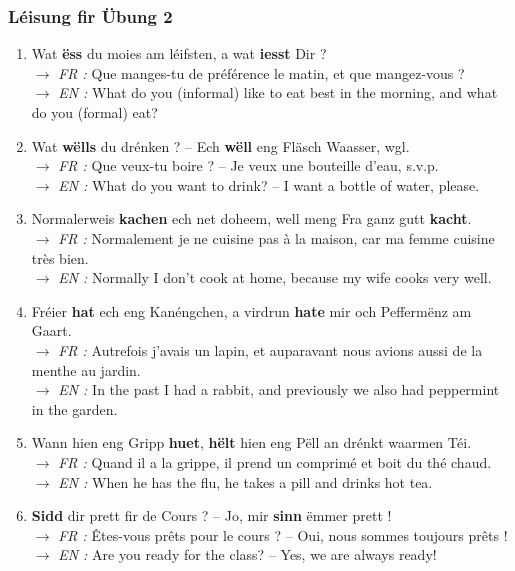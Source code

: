 \subsubsection*{Léisung fir Übung 2}
\begin{enumerate}
    \item Wat \textbf{ëss} du moies am léifsten, a wat \textbf{iesst} Dir ? \\
    $\rightarrow$ \textit{FR :} Que manges-tu de préférence le matin, et que mangez-vous ? \\
    $\rightarrow$ \textit{EN :} What do you (informal) like to eat best in the morning, and what do you (formal) eat?
    \item Wat \textbf{wëlls} du drénken ? -- Ech \textbf{wëll} eng Fläsch Waasser, wgl. \\
    $\rightarrow$ \textit{FR :} Que veux-tu boire ? -- Je veux une bouteille d'eau, s.v.p. \\
    $\rightarrow$ \textit{EN :} What do you want to drink? -- I want a bottle of water, please.
    \item Normalerweis \textbf{kachen} ech net doheem, well meng Fra ganz gutt \textbf{kacht}. \\
    $\rightarrow$ \textit{FR :} Normalement je ne cuisine pas à la maison, car ma femme cuisine très bien. \\
    $\rightarrow$ \textit{EN :} Normally I don't cook at home, because my wife cooks very well.
    \item Fréier \textbf{hat} ech eng Kanéngchen, a virdrun \textbf{hate} mir och Peffermënz am Gaart. \\
    $\rightarrow$ \textit{FR :} Autrefois j'avais un lapin, et auparavant nous avions aussi de la menthe au jardin. \\
    $\rightarrow$ \textit{EN :} In the past I had a rabbit, and previously we also had peppermint in the garden.
    \item Wann hien eng Gripp \textbf{huet}, \textbf{hëlt} hien eng Pëll an drénkt waarmen Téi. \\
    $\rightarrow$ \textit{FR :} Quand il a la grippe, il prend un comprimé et boit du thé chaud. \\
    $\rightarrow$ \textit{EN :} When he has the flu, he takes a pill and drinks hot tea.
    \item \textbf{Sidd} dir prett fir de Cours ? -- Jo, mir \textbf{sinn} ëmmer prett ! \\
    $\rightarrow$ \textit{FR :} Êtes-vous prêts pour le cours ? -- Oui, nous sommes toujours prêts ! \\
    $\rightarrow$ \textit{EN :} Are you ready for the class? -- Yes, we are always ready!
\end{enumerate}

